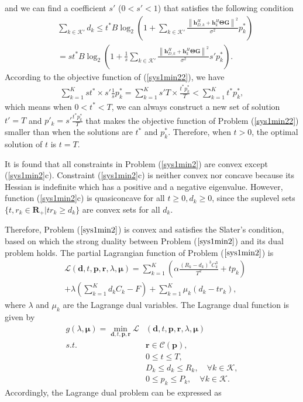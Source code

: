 \documentclass[journal]{IEEEtran}
\begin{document}
and we can find a coefficient $s'$ ($0<s'<1$) that satisfies the following condition
{\begin{align}
&\sum_{k\in\mathcal K'}d_k \leq t^*B \log_2 \left( 1+ {\sum_{k\in\mathcal K'}\frac{\left\|\pmb h_{D,k}^H+\pmb h_{k}^H \pmb \Theta \pmb G\right\|^2}{\sigma^2}  {p^*_k}} \right)\\\nonumber
&= st^*B \log_2 \left( 1+ \frac{1}{s}{\sum_{k\in\mathcal K'}\frac{\left\|\pmb h_{D,k}^H+\pmb h_{k}^H \pmb \Theta \pmb G\right\|^2}{\sigma^2}  s'{p^*_k}} \right).
\end{align}}
According to the objective function of (\ref{sys1min22}), we have
\begin{align}
\sum_{k=1}^K st^*\times s'\frac{1}{s}p^*_k=\sum_{k=1}^K s'T\times \frac{t^*p^*_k}{T}<\sum_{k=1}^K t^*p^*_k,
\end{align}
which means when $0<t^*<T$, we can always construct a new set of solution $t'=T$ and $p'_k=s'\frac{t^*p^*_k}{T}$ that makes the objective function of Problem (\ref{sys1min22}) smaller than when the solutions are $t^*$ and $p^*_k$.
Therefore, when $t>0$, the optimal solution of $t$ is $t=T$.
 

It is found that all constraints in Problem (\ref{sys1min2}) are convex except (\ref{sys1min2}c).
Constraint (\ref{sys1min2}c) is neither convex nor concave because its Hessian is indefinite which has a positive and a negative eigenvalue. However, function (\ref{sys1min2}c) is quasiconcave for all $t\geq 0, d_k \geq 0$, since the suplevel sets $\{t, r_k \in \pmb R_+| tr_k\geq d_k \}$ are convex sets for all $d_k$\cite{boyd2004convex}.

Therefore, Problem ($\ref{sys1min2}$) is convex and satisfies the Slater's condition, based on which the strong duality between Problem ($\ref{sys1min2}$) and its dual problem holds. The partial Lagrangian function of Problem ($\ref{sys1min2}$) is
\begin{align}\label{lagarangian}
&\mathcal L(\pmb d,t,\pmb p,\pmb r,\lambda,\pmb \mu)= \sum_{k=1}^K (\alpha\frac{(R_{k}-d_{k})^3 C^3_{k}}{T^2}+tp_k)\\ \nonumber
&+\lambda( \sum_{k=1}^K d_kC_k-F)+\sum_{k=1}^K\mu_k(d_k-tr_k),
\end{align}
where $\lambda$ and $\mu_k$ are the Lagrange dual variables.
The Lagrange dual function is given by
\begin{subequations}\label{sys1min3}
	\begin{align}
	g(\lambda,\pmb \mu)=\mathop{\min}_{\pmb d, t,\pmb p,\pmb r} \mathcal L&(\pmb d,t,\pmb p,\pmb r,\lambda,\pmb \mu)\\
	s.t. \quad &\pmb r \in \mathcal C(\pmb p),\\
	&  0\leq t \leq T,\\
	&  D_{k} \leq d_{k} \leq R_{k}, \quad \forall k\in\mathcal K,\\
	&  0\leq p_k\leq P_k, \quad \forall k\in\mathcal K.
	\end{align}
\end{subequations}
Accordingly, the Lagrange dual problem can be expressed as
\end{document}
